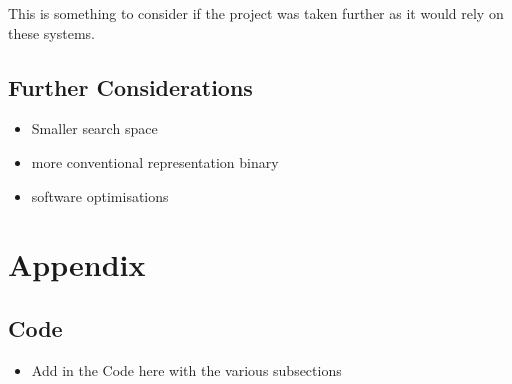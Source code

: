 \documentclass[a4paper]{article}
\begin{document}
This is something to consider if the project was taken further as it would rely on these systems.
\subsection{Further Considerations}
\par
\begin{itemize}
	\item Smaller search space
	\item more conventional representation binary
	\item software optimisations
\end{itemize}

\pagebreak
\section{Appendix}
\subsection{Code} %
\begin{itemize}
	\item Add in the Code here with the various subsections
\end{itemize}
\end{document}
